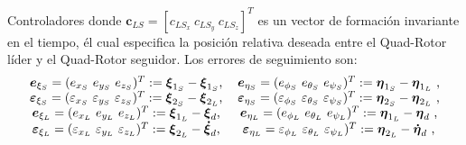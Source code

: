 \documentclass[hyperref={pdfpagelabels=false}]{beamer}
\begin{document}
\begin{frame}{Controladores} 
donde $\boldsymbol{c}_{LS}= [c_{LS_x}~ c_{LS_y}~ c_{LS_z}]^T$ es un vector de formación invariante en el tiempo, \'el cual especifica la posición relativa deseada entre el Quad-Rotor líder y el Quad-Rotor seguidor.
Los errores de seguimiento son:
\begin{equation*}
    \begin{tabular}{c c}
         $\boldsymbol e_{\xi_S} = (e_{x_S} ~ e_{y_S} ~ e_{z_S})^T := \boldsymbol \xi_{1_S} - \boldsymbol \xi_{1_S}$, & $\boldsymbol e_{\eta_S} = (e_{\phi_S} ~ e_{\theta_S} ~ e_{\psi_S})^T := \boldsymbol \eta_{1_S} - \boldsymbol \eta_{1_L}$ ,\\
         $\boldsymbol \varepsilon_{\xi_S} = (\varepsilon_{x_S} ~ \varepsilon_{y_S} ~ \varepsilon_{z_S})^T := \boldsymbol \xi_{2_S} - \boldsymbol \xi_{2_L}$, & $\boldsymbol \varepsilon_{\eta_S} = (\varepsilon_{\phi_S} ~ \varepsilon_{\theta_S} ~ \varepsilon_{\psi_S})^T := \boldsymbol \eta_{2_S} - \boldsymbol \eta_{2_L}   $ ,\\
         $\boldsymbol e_{\xi_L} = (e_{x_L} ~ e_{y_L} ~ e_{z_L})^T  := \boldsymbol \xi_{1_L} - \boldsymbol \xi_{d}$,& $\boldsymbol e_{\eta_L} = (e_{\phi_L} ~ e_{\theta_L} ~ e_{\psi_L})^T := \boldsymbol \eta_{1_L} - \boldsymbol \eta_{d}$ ,\\
         $\boldsymbol \varepsilon_{\xi_L} = (\varepsilon_{x_L} ~ \varepsilon_{y_L} ~ \varepsilon_{z_L})^T := \boldsymbol \xi_{2_L} - \boldsymbol {\dot{\xi}}_{d} $, & $\boldsymbol \varepsilon_{\eta_L} = \varepsilon_{\phi_L} ~ \varepsilon_{\theta_L} ~ \varepsilon_{\psi_L})^T  := \boldsymbol \eta_{2_L} - \boldsymbol {\dot{\eta}}_{d} $ ,\\
    \end{tabular}
\end{equation*}
\end{frame}
\end{document}
